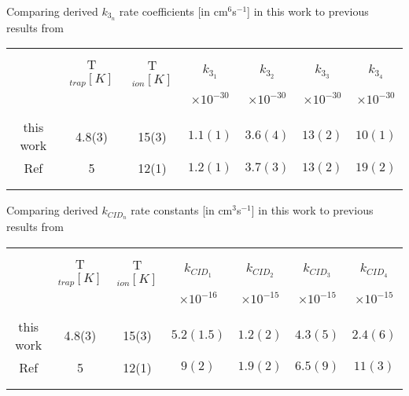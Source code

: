 \begin{threeparttable}[!htb]
    \centering
    \caption{Comparing derived $k_{3_n}$ rate coefficients [in cm$^6$s$^{-1}$] in this work to previous results from \citet{Brunken2017}}
     \begin{tabular}{ccccccc}
        \hline\\
        & T$_{trap} [K]$ & T$_{ion} [K]$& $k_{3_1}$ &  $k_{3_2}$ & $k_{3_3}$ & $k_{3_4}$ \\
        &&& $\times 10^{-30}$ & $\times 10^{-30}$ & $\times 10^{-30}$ & $\times 10^{-30}$\\
        \\\hline\hline\\
        this work & 4.8(3) & 15(3) & $1.1(1)$ & $3.6(4)$ & $13(2)$ & $10(1)$ \\
        Ref \cite{Brunken2017} & 5 & 12(1) & $1.2(1)$ & $3.7(3)$ & $13(2)$ & $19(2)$ \\
        \\\hline\hline\\
    \end{tabular}
    \label{tab:k3:rate-constants}
\end{threeparttable}

\begin{threeparttable}[!htb]
    \centering
    \caption{Comparing derived  $k_{CID_n}$ rate constants [in cm$^3$s$^{-1}$] in this work to previous results from \citet{Brunken2017}}
    \begin{tabular}{ccccccc}
        \hline\\
        & T$_{trap} [K]$ & T$_{ion} [K]$& $k_{CID_1}$ &  $k_{CID_2}$ & $k_{CID_3}$ & $k_{CID_4}$ \\
        &&& $\times 10^{-16}$ & $\times 10^{-15}$ & $\times 10^{-15}$ & $\times 10^{-15}$\\
        \\\hline\hline\\
        this work & 4.8(3) &  15(3) & $5.2(1.5)$ & $1.2(2)$ & $4.3(5)$ & $2.4(6)$ \\
        Ref \cite{Brunken2017} & 5 & 12(1) & $9(2)$ & $1.9(2)$ & $6.5(9)$ & $11(3)$ \\
        \\\hline\hline\\
    \end{tabular}
    \label{tab:kCID:rate-constants}
\end{threeparttable}